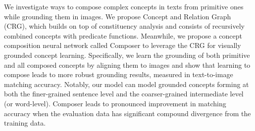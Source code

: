 We investigate ways to compose complex concepts in texts from primitive ones while grounding them in images. We propose Concept and Relation Graph (CRG), which builds on top of constituency analysis and consists of recursively combined concepts with predicate functions. Meanwhile, we propose a concept composition neural network called Composer to leverage the CRG for visually grounded concept learning. Specifically, we learn the grounding of both primitive and all composed concepts by aligning them to images and show that learning to compose leads to more robust grounding results, measured in text-to-image matching accuracy. Notably, our model can model grounded concepts forming at both the finer-grained sentence level and the coarser-grained intermediate level (or word-level). Composer leads to pronounced improvement in  matching accuracy when the evaluation data has significant compound divergence from the training data.

